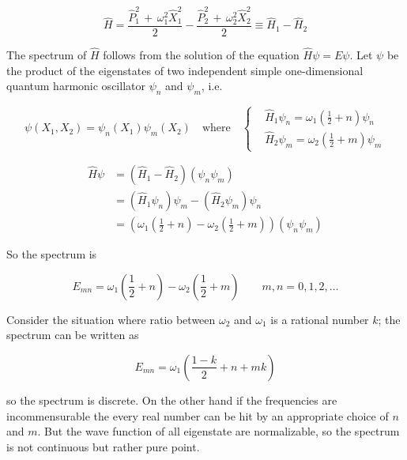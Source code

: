 \begin{equation}
  \hat{H} =
  \frac{\hat{P}_1^2 \, + \, \omega_1^2 \hat{X}_1^2}{2} -
  \frac{\hat{P}_2^2 \, + \, \omega_2^2 \hat{X}_2^2}{2} \equiv
  \hat{H}_1 - \hat{H}_2
\end{equation}

The spectrum of $\hat{H}$ follows from the solution of the equation
$\hat{H} \psi = E \psi$. Let $\psi$ be the product of the eigenstates of two
independent simple one-dimensional quantum harmonic oscillator $\psi_n$ and
$\psi_m$, i.e.

\begin{equation*}
  \psi(X_1, X_2) = \psi_n(X_1) \psi_m(X_2)
  \quad \text{where} \quad
  \begin{cases}
    &\hat{H}_1\psi_n = \omega_1 \left( \frac{1}{2} + n \right)\psi_n \\
    &\hat{H}_2\psi_m = \omega_2 \left( \frac{1}{2} + m \right)\psi_m
  \end{cases}
\end{equation*}

\begin{align*}
  \hat{H} \psi
  &= \left(\hat{H}_1 - \hat{H}_2\right) \left(\psi_n \psi_m\right) \\
  &= \left(\hat{H}_1\psi_n\right)\psi_m - \left(\hat{H}_2\psi_m\right)\psi_n \\
  &= \left(
    \omega_1\left(\frac{1}{2} + n\right) -
    \omega_2\left(\frac{1}{2} + m\right)
     \right) \left(\psi_n\psi_m\right)
\end{align*}



So the spectrum is

\begin{equation}
  E_{mn} =
  \omega_1 \left( \frac{1}{2} + n \right) -
  \omega_2 \left( \frac{1}{2} + m \right)
  \qquad m,n = 0,1,2,\ldots
\end{equation}

Consider the situation where ratio between $\omega_2$ and $\omega_1$ is a
rational number $k$; the spectrum can be written as

\begin{equation*}
  E_{mn} = \omega_1 \left( \frac{1-k}{2} + n + mk \right)
\end{equation*}

so the spectrum is discrete. On the other hand if the frequencies are
incommensurable the every real number can be hit by an appropriate choice of
$n$ and $m$. But the wave function of all eigenstate are normalizable, so the
spectrum is not continuous but rather pure point.


